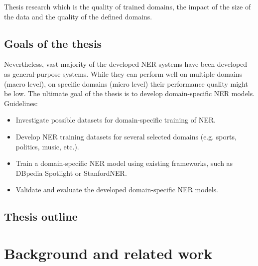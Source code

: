 \documentclass[thesis=M,english]{FITthesis}[2018/05/30]
\begin{document}
\begin{introduction}
	  Thesis research which is the quality of trained domains, the impact of the size of the data and the quality of the defined domains.
	  
	  
\section{Goals of the thesis}	
	Nevertheless, vast majority of the developed NER systems have been developed as general-purpose systems. While they can perform well on multiple domains (macro level), on specific domains (micro level) their performance quality might be low. The ultimate goal of the thesis is to develop domain-specific NER models. Guidelines:
\begin{itemize}
\item Investigate possible datasets for domain-specific training of NER.
\item Develop NER training datasets for several selected domains (e.g. sports,
politics, music, etc.).
\item Train a domain-specific NER model using existing frameworks, such as
DBpedia Spotlight or StanfordNER.
\item Validate and evaluate the developed domain-specific NER models. 

\end{itemize}	
	
\section{Thesis outline}
	

\end{introduction}

\chapter{Background and related work}\label{}

	
\end{document}

